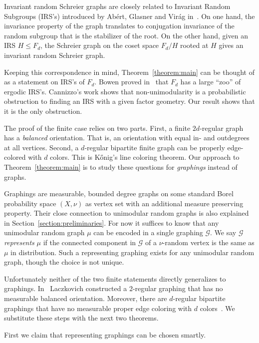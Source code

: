 \documentclass[11pt]{article}
\theoremstyle{definition}
\numberwithin{equation}{section}
\numberwithin{figure}{section}
\numberwithin{table}{section}
\newcommand{\G}{\mathcal{G}}
\begin{document}
Invariant random Schreier graphs are closely related to Invariant Random Subgroups (IRS's) introduced by Abért, Glasner and Virág in~\cite{abert2014kesten}. On one hand, the invariance property of the graph translates to conjugation invariance of the random subgroup that is the stabilizer of the root. On the other hand, given an IRS $H \leq F_d$, the Schreier graph on the coset space $F_d/H$ rooted at $H$ gives an invariant random Schreier graph.

Keeping this correspondence in mind, Theorem~\ref{theorem:main} can be thought of as a statement on IRS's of $F_d$. Bowen proved in~\cite{bowen2012invariant} that $F_d$ has a large ``zoo'' of ergodic IRS's. Cannizzo's work shows that non-unimodularity is a probabilistic obstruction to finding an IRS with a given factor geometry. Our result shows that it is the only obstruction.

The proof of the finite case relies on two parts. First, a finite $2d$-regular graph has a \emph{balanced} orientation. That is, an orientation with equal in- and outdegrees at all vertices. Second, a $d$-regular bipartite finite graph can be properly edge-colored with $d$ colors. This is K{\H o}nig's line coloring theorem. Our approach to Theorem~\ref{theorem:main} is to study these questions for \emph{graphings} instead of graphs.

Graphings are measurable, bounded degree graphs on some standard Borel probability space $(X,\nu)$ as vertex set with an additional measure preserving property. Their close connection to unimodular random graphs is also explained in Section~\ref{section:preliminaries}. For now it suffices to know that any unimodular random graph $\mu$ can be encoded in a single graphing $\G$. We say $\G$ \emph{represents} $\mu$ if the connected component in $\G$ of a $\nu$-random vertex is the same as $\mu$ in distribution. Such a representing graphing exists for any unimodular random graph, though the choice is not unique.

Unfortunately neither of the two finite statements directly generalizes to graphings. In~\cite{laczkovich1988closed} Laczkovich constructed a $2$-regular graphing that has no measurable balanced orientation. Moreover, there are $d$-regular bipartite graphings that have no measurable proper edge coloring with $d$ colors~\cite[Section~6]{conley2013measurable}. We substitute these steps with the next two theorems.

First we claim that representing graphings can be chosen smartly.
\end{document}
